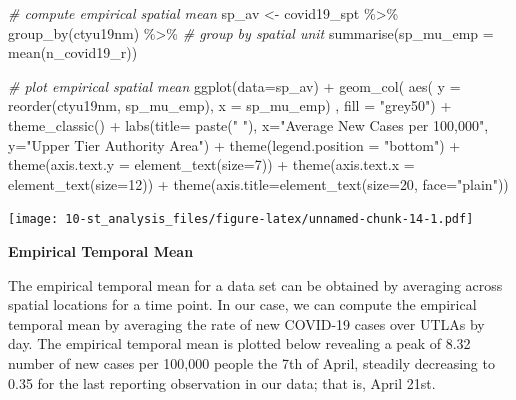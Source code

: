 \documentclass[
]{book}
\newenvironment{Shaded}{\begin{snugshade}}{\end{snugshade}}
\newcommand{\AttributeTok}[1]{\textcolor[rgb]{0.77,0.63,0.00}{#1}}
\newcommand{\CommentTok}[1]{\textcolor[rgb]{0.56,0.35,0.01}{\textit{#1}}}
\newcommand{\DecValTok}[1]{\textcolor[rgb]{0.00,0.00,0.81}{#1}}
\newcommand{\FunctionTok}[1]{\textcolor[rgb]{0.00,0.00,0.00}{#1}}
\newcommand{\NormalTok}[1]{#1}
\newcommand{\OtherTok}[1]{\textcolor[rgb]{0.56,0.35,0.01}{#1}}
\newcommand{\SpecialCharTok}[1]{\textcolor[rgb]{0.00,0.00,0.00}{#1}}
\newcommand{\StringTok}[1]{\textcolor[rgb]{0.31,0.60,0.02}{#1}}
\begin{document}
\begin{Shaded}
\begin{Highlighting}[]
\CommentTok{\# compute empirical spatial mean}
\NormalTok{sp\_av }\OtherTok{\textless{}{-}}\NormalTok{ covid19\_spt }\SpecialCharTok{\%\textgreater{}\%} \FunctionTok{group\_by}\NormalTok{(ctyu19nm) }\SpecialCharTok{\%\textgreater{}\%} \CommentTok{\# group by spatial unit}
  \FunctionTok{summarise}\NormalTok{(}\AttributeTok{sp\_mu\_emp =} \FunctionTok{mean}\NormalTok{(n\_covid19\_r))}

\CommentTok{\# plot empirical spatial mean}
\FunctionTok{ggplot}\NormalTok{(}\AttributeTok{data=}\NormalTok{sp\_av) }\SpecialCharTok{+}
  \FunctionTok{geom\_col}\NormalTok{( }\FunctionTok{aes}\NormalTok{( }\AttributeTok{y =} \FunctionTok{reorder}\NormalTok{(ctyu19nm, sp\_mu\_emp), }\AttributeTok{x =}\NormalTok{ sp\_mu\_emp) , }\AttributeTok{fill =} \StringTok{"grey50"}\NormalTok{) }\SpecialCharTok{+}
  \FunctionTok{theme\_classic}\NormalTok{() }\SpecialCharTok{+}
  \FunctionTok{labs}\NormalTok{(}\AttributeTok{title=} \FunctionTok{paste}\NormalTok{(}\StringTok{" "}\NormalTok{), }\AttributeTok{x=}\StringTok{"Average New Cases per 100,000"}\NormalTok{, }\AttributeTok{y=}\StringTok{"Upper Tier Authority Area"}\NormalTok{) }\SpecialCharTok{+}
  \FunctionTok{theme}\NormalTok{(}\AttributeTok{legend.position =} \StringTok{"bottom"}\NormalTok{) }\SpecialCharTok{+}
  \FunctionTok{theme}\NormalTok{(}\AttributeTok{axis.text.y =} \FunctionTok{element\_text}\NormalTok{(}\AttributeTok{size=}\DecValTok{7}\NormalTok{)) }\SpecialCharTok{+}
  \FunctionTok{theme}\NormalTok{(}\AttributeTok{axis.text.x =} \FunctionTok{element\_text}\NormalTok{(}\AttributeTok{size=}\DecValTok{12}\NormalTok{)) }\SpecialCharTok{+}
  \FunctionTok{theme}\NormalTok{(}\AttributeTok{axis.title=}\FunctionTok{element\_text}\NormalTok{(}\AttributeTok{size=}\DecValTok{20}\NormalTok{, }\AttributeTok{face=}\StringTok{"plain"}\NormalTok{))}
\end{Highlighting}
\end{Shaded}

\texttt{[image: 10-st\_analysis\_files/figure-latex/unnamed-chunk-14-1.pdf]}

\textbf{Empirical Temporal Mean}

The empirical temporal mean for a data set can be obtained by averaging across spatial locations for a time point. In our case, we can compute the empirical temporal mean by averaging the rate of new COVID-19 cases over UTLAs by day. The empirical temporal mean is plotted below revealing a peak of 8.32 number of new cases per 100,000 people the 7th of April, steadily decreasing to 0.35 for the last reporting observation in our data; that is, April 21st.
\end{document}
